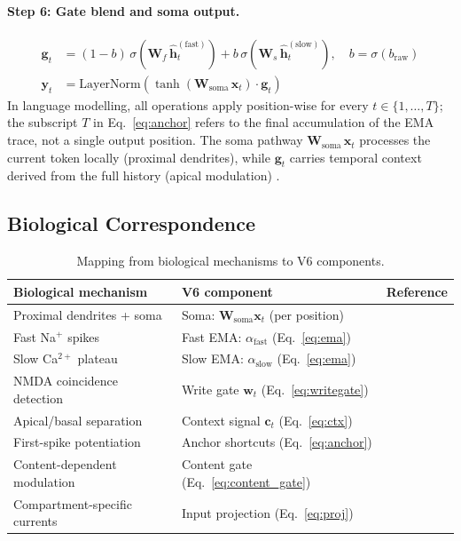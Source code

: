 \documentclass[11pt,a4paper]{article}
\begin{document}
\paragraph{Step 6: Gate blend and soma output.}
\begin{align}
  \mathbf{g}_t &= (1-b)\,\sigma(\mathbf{W}_f\,\hat{\mathbf{h}}_t^{(\mathrm{fast})})
                + b\,\sigma(\mathbf{W}_s\,\hat{\mathbf{h}}_t^{(\mathrm{slow})}),
               \quad b = \sigma(b_\mathrm{raw})
  \label{eq:gate}\\
  \mathbf{y}_t &= \mathrm{LayerNorm}\!\left(
                \tanh(\mathbf{W}_\mathrm{soma}\,\mathbf{x}_t) \cdot \mathbf{g}_t
                \right)
  \label{eq:output}
\end{align}
In language modelling, all operations apply position-wise for every
$t \in \{1,\ldots,T\}$; the subscript $T$ in Eq.~\ref{eq:anchor} refers
to the final accumulation of the EMA trace, not a single output position.
The soma pathway $\mathbf{W}_\mathrm{soma}\,\mathbf{x}_t$ processes the
current token locally (proximal dendrites), while $\mathbf{g}_t$ carries
temporal context derived from the full history (apical modulation)
\citep{larkum2013cellular}.

\subsection{Biological Correspondence}

\begin{table}[t]
\centering
\caption{Mapping from biological mechanisms to V6 components.}
\label{tab:bio_map}
\begin{tabular}{@{}lll@{}}
\toprule
Biological mechanism & V6 component & Reference \\
\midrule
Proximal dendrites + soma       & Soma: $\mathbf{W}_\mathrm{soma}\mathbf{x}_t$ (per position) & \citet{larkum2013cellular} \\
Fast Na$^+$ spikes              & Fast EMA: $\alpha_\mathrm{fast}$ (Eq.~\ref{eq:ema}) & \citet{losonczy2006integrative} \\
Slow Ca$^{2+}$ plateau          & Slow EMA: $\alpha_\mathrm{slow}$ (Eq.~\ref{eq:ema}) & \citet{francioni2026vectorized} \\
NMDA coincidence detection      & Write gate $\mathbf{w}_t$ (Eq.~\ref{eq:writegate})  & \citet{malenka1993nmda} \\
Apical/basal separation         & Context signal $\mathbf{c}_t$ (Eq.~\ref{eq:ctx})    & \citet{larkum2013cellular} \\
First-spike potentiation        & Anchor shortcuts (Eq.~\ref{eq:anchor})               & \citet{larkum1999new} \\
Content-dependent modulation    & Content gate (Eq.~\ref{eq:content_gate})              & \citet{francioni2026vectorized} \\
Compartment-specific currents   & Input projection (Eq.~\ref{eq:proj})                 & \citet{larkum2013cellular} \\
\bottomrule
\end{tabular}
\end{table}
\end{document}
